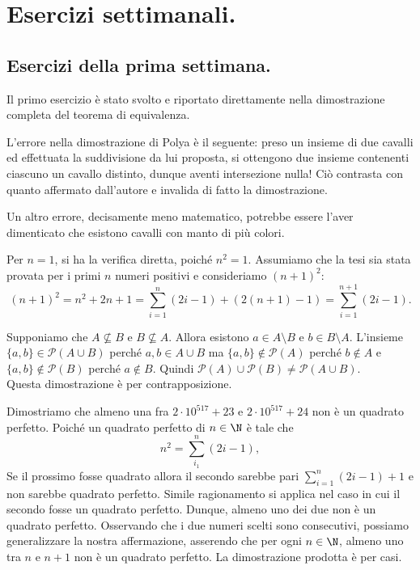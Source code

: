 \section{Esercizi settimanali.}

\subsection{Esercizi della prima settimana.}
\begin{exe}
  Il primo esercizio è stato svolto e riportato direttamente nella dimostrazione completa del teorema di equivalenza.
\end{exe}
\begin{exe}
  L'errore nella dimostrazione di Polya è il seguente: preso un insieme di due cavalli ed effettuata la suddivisione da lui proposta, si ottengono due insieme contenenti ciascuno un cavallo distinto, dunque aventi intersezione nulla! Ciò contrasta con quanto affermato dall'autore e invalida di fatto la dimostrazione.

  Un altro errore, decisamente meno matematico, potrebbe essere l'aver dimenticato che esistono cavalli con manto di più colori.
\end{exe}
\begin{exe}
  Per \(n = 1\), si ha la verifica diretta, poiché \(n^2 = 1\). Assumiamo che la tesi sia stata provata per i primi \(n\) numeri positivi e consideriamo \((n+1)^2\):
  \begin{equation}
    (n+1)^2 = n^2 + 2n + 1 = \sum_{i=1}^n (2i - 1) + (2(n + 1) - 1) = \sum_{i = 1}^{n+1}(2i - 1).
  \end{equation}
\end{exe}
\begin{exe}
\end{exe}

\begin{exe}
Supponiamo che $A \not\subseteq B$ e $B \not\subseteq A$. Allora esistono $a \in A\setminus B$ e $b\in B\setminus A$. L'insieme $\{ a,b\} \in \mathcal{P} (A\cup B)$ perché $a,b\in A\cup B$ ma $\{ a,b\} \not\in \mathcal{P} (A)$ perché $b \not\in A$ e $\{ a,b\} \not\in \mathcal{P} (B)$ perché $a \not\in B$. Quindi $\mathcal{P} (A) \cup \mathcal{P} (B) \not = \mathcal{P} (A\cup B)$. \\
Questa dimostrazione è per contrapposizione.
\end{exe}

\begin{exe}
  Dimostriamo che almeno una fra \(2\cdot10^517 + 23\) e \(2\cdot10^517+24\) non è un quadrato perfetto. Poiché un quadrato perfetto di \(n \in \N\) è tale che
  \[
  n^2 = \sum_{i_1}^{n}(2i - 1),
  \]
  Se il prossimo fosse quadrato allora il secondo sarebbe pari \(\sum_{i=1}^n(2i-1) + 1\) e non sarebbe quadrato perfetto. Simile ragionamento si applica nel caso in cui il secondo fosse un quadrato perfetto. Dunque, almeno uno dei due non è un quadrato perfetto. Osservando che i due numeri scelti sono consecutivi, possiamo generalizzare la nostra affermazione, asserendo che per ogni \(n \in \N\), almeno uno tra \(n\) e \(n+1\) non è un quadrato perfetto. La dimostrazione prodotta è per casi.
\end{exe}

